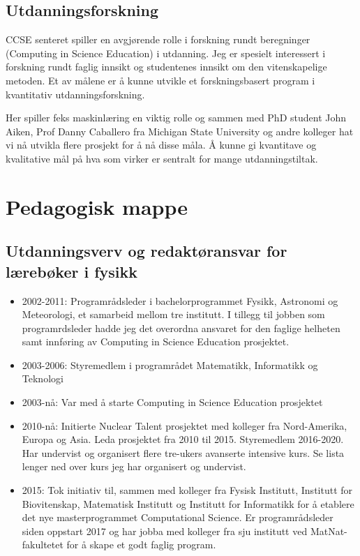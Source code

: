 \documentclass[aps,floatfix,preprint]{revtex4-1}
\begin{document}
\subsection*{Utdanningsforskning}

CCSE senteret spiller en avgjørende rolle i forskning rundt
beregninger (Computing in Science Education) i utdanning. Jeg er
spesielt interessert i forskning rundt faglig innsikt og studentenes
innsikt om den vitenskapelige metoden. Et av målene er å kunne utvikle
et forskningsbasert program i kvantitativ utdanningsforskning.

Her spiller feks maskinlæring en viktig rolle og sammen med PhD
student John Aiken, Prof Danny Caballero fra Michigan State University
og andre kolleger hat vi nå utvikla flere prosjekt for å nå disse
måla.  Å kunne gi kvantitave og kvalitative mål på hva som virker er
sentralt for mange utdanningstiltak.


\newpage

\section*{Pedagogisk mappe}

\subsection*{Utdanningsverv og redaktøransvar for lærebøker i fysikk}
\begin{itemize}
\item 2002-2011: Programrådsleder i bachelorprogrammet Fysikk, Astronomi og Meteorologi, et samarbeid mellom tre institutt. I tillegg til jobben som programrdsleder hadde jeg det overordna ansvaret for den faglige helheten samt innføring av Computing in Science Education prosjektet.
\item 2003-2006: Styremedlem i programrådet Matematikk, Informatikk og Teknologi
\item 2003-nå:  Var med å starte Computing in Science Education prosjektet
\item 2010-nå: Initierte Nuclear Talent prosjektet med kolleger fra Nord-Amerika, Europa og Asia. Leda prosjektet fra 2010 til 2015. Styremedlem 2016-2020. Har undervist og organisert flere tre-ukers avanserte intensive kurs. Se lista lenger ned over kurs jeg har organisert og undervist.
\item 2015: Tok initiativ til, sammen med kolleger fra Fysisk Institutt, Institutt for Biovitenskap, Matematisk Institutt og Institutt for Informatikk for å etablere det nye masterprogrammet Computational Science. Er programrådsleder siden oppstart 2017 og har jobba med kolleger fra sju institutt ved MatNat-fakultetet for å skape et godt faglig program.
\end{itemize}
\end{document}
